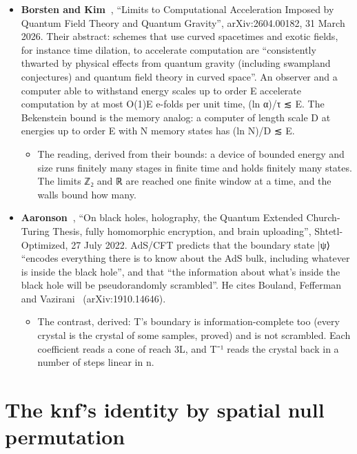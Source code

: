 \begin{itemize}
\item \textbf{Borsten and Kim~\cite{src:Borsten-and-Kim-2026}}, “Limits to Computational Acceleration Imposed by Quantum Field Theory and Quantum Gravity”, arXiv:2604.00182, 31 March 2026. Their abstract: schemes that use curved spacetimes and exotic fields, for instance time dilation, to accelerate computation are “consistently thwarted by physical effects from quantum gravity (including swampland conjectures) and quantum field theory in curved space”. An observer and a computer able to withstand energy scales up to order E accelerate computation by at most O(1)E e-folds per unit time, (ln α)/τ ≲ E. The Bekenstein bound is the memory analog: a computer of length scale D at energies up to order E with N memory states has (ln N)/D ≲ E.

\begin{itemize}
\item The reading, derived from their bounds: a device of bounded energy and size runs finitely many stages in finite time and holds finitely many states. The limits ℤ₂ and ℝ are reached one finite window at a time, and the walls bound how many.
\end{itemize}
\item \textbf{Aaronson~\cite{src:Aaronson-2022}}, “On black holes, holography, the Quantum Extended Church-Turing Thesis, fully homomorphic encryption, and brain uploading”, Shtetl-Optimized, 27 July 2022. AdS/CFT predicts that the boundary state |ψ⟩ “encodes everything there is to know about the AdS bulk, including whatever is inside the black hole”, and that “the information about what's inside the black hole will be pseudorandomly scrambled”. He cites Bouland, Fefferman and Vazirani~\cite{src:Bouland-2019} (arXiv:1910.14646).

\begin{itemize}
\item The contrast, derived: T's boundary is information-complete too (every crystal is the crystal of some samples, proved) and is not scrambled. Each coefficient reads a cone of reach 3L, and T⁻¹ reads the crystal back in a number of steps linear in n.
\end{itemize}
\end{itemize}

\section{\texorpdfstring{The knf's identity by spatial null permutation}{The knf's identity by spatial null permutation}}

